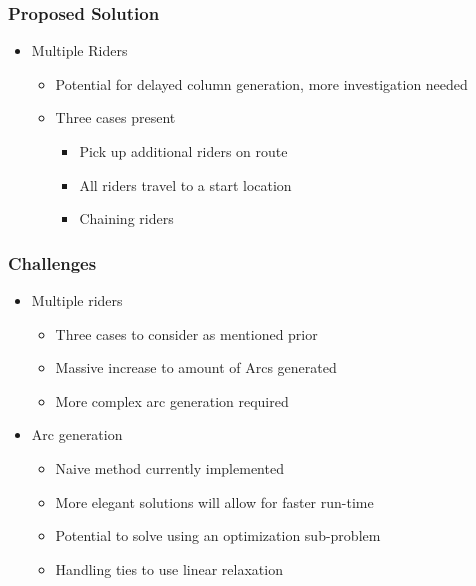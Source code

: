 \documentclass{beamer}
\begin{document}
\begin{frame}
	\frametitle{Proposed Solution}
\begin{itemize}
         \item Multiple Riders
         \begin{itemize}
         	\item Potential for delayed column generation, more investigation needed
            \item Three cases present
            \begin{itemize}
            \item Pick up additional riders on route
            \item All riders travel to a start location   
            \item Chaining riders
            \end{itemize}
         \end{itemize}
         
\end{itemize}

\end{frame}
\begin{frame}
	\frametitle{Challenges}
    \begin{itemize}
    	\item Multiple riders
        \begin{itemize}
        	\item Three cases to consider as mentioned prior 
            \item Massive increase to amount of Arcs generated
            \item More complex arc generation required
        \end{itemize}
        \item Arc generation 
        
       \begin{itemize}
       		\item Naive method currently implemented 
            \item More elegant solutions will allow for faster run-time
            \item Potential to solve using an optimization sub-problem
            \item Handling ties to use linear relaxation
       \end{itemize}
    \end{itemize}

\end{frame}
\end{document}
